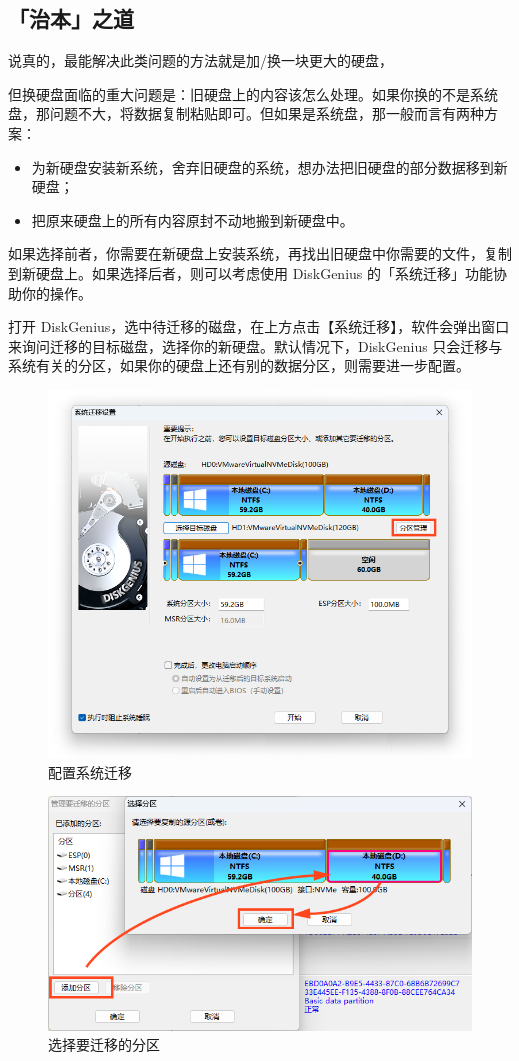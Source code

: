 {{{{\subsection{「治本」之道}

说真的，最能解决此类问题的方法就是加/换一块更大的硬盘，

但换硬盘面临的重大问题是：旧硬盘上的内容该怎么处理。如果你换的不是系统盘，那问题不大，将数据复制粘贴即可。但如果是系统盘，那一般而言有两种方案：

\begin{itemize}
  \item 为新硬盘安装新系统，舍弃旧硬盘的系统，想办法把旧硬盘的部分数据移到新硬盘；
  \item 把原来硬盘上的所有内容原封不动地搬到新硬盘中。
\end{itemize}

如果选择前者，你需要在新硬盘上安装系统，再找出旧硬盘中你需要的文件，复制到新硬盘上。如果选择后者，则可以考虑使用 DiskGenius 的「系统迁移」功能协助你的操作。

打开 DiskGenius，选中待迁移的磁盘，在上方点击【系统迁移】，软件会弹出窗口来询问迁移的目标磁盘，选择你的新硬盘。默认情况下，DiskGenius 只会迁移与系统有关的分区，如果你的硬盘上还有别的数据分区，则需要进一步配置。

\begin{figure}[htb!]
  \centering
  \includegraphics[width=.65\textwidth]{assets/advanced/Configure_System_Migration.png}
  \caption{配置系统迁移}
  \label{fig:Configure_System_Migration}
\end{figure}

\begin{figure}[htb!]
  \centering
  \includegraphics[width=.56\textwidth]{assets/advanced/Select_Migrating_Partition.png}
  \caption{选择要迁移的分区}
  \label{fig:Select_Migrating_Partition}
\end{figure}

}}}}

